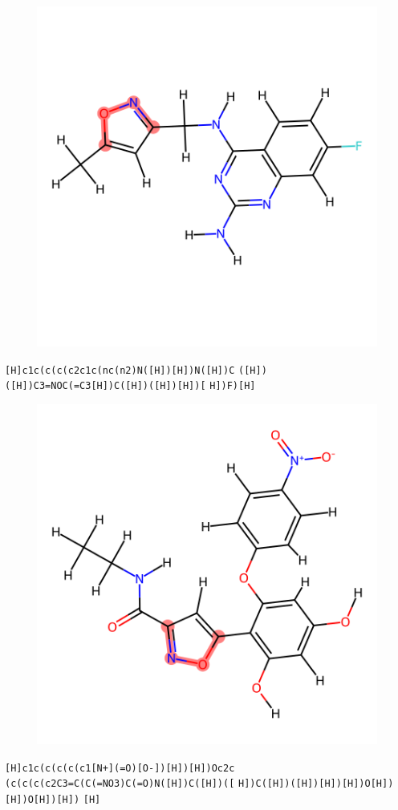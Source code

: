 \documentclass{article}
\begin{document}
\begin{figure}[ht]
\centering
    \includegraphics{mol158.png}
\end{figure}
\verb|[H]c1c(c(c(c2c1c(nc(n2)N([H])[H])N([H])C| \verb|([H])([H])C3=NOC(=C3[H])C([H])([H])[H])[| \verb|H])F)[H]|

\begin{figure}[ht]
\centering
    \includegraphics{mol159.png}
\end{figure}
\verb|[H]c1c(c(c(c(c1[N+](=O)[O-])[H])[H])Oc2c| \verb|(c(c(c(c2C3=C(C(=NO3)C(=O)N([H])C([H])([| \verb|H])C([H])([H])[H])[H])O[H])[H])O[H])[H])| \verb|[H]|
\end{document}
